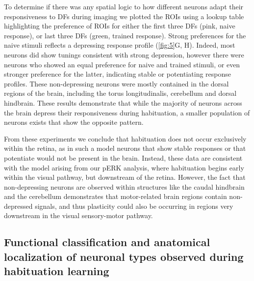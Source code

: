 \documentclass[9pt,lineno]{RandlettLab_elife}
\begin{document}
To determine if there was any spatial logic to how different neurons adapt their responsiveness to DFs during imaging we plotted the ROIs using a lookup table highlighting the preference of ROIs for either the first three DFs (pink, naive response), or last three DFs (green, trained response). Strong preferences for the naive stimuli reflects a depressing response profile (\autoref{fig:5}G, H). Indeed, most neurons did show tunings consistent with strong depression, however there were neurons who showed an equal preference for naive and trained stimuli, or even stronger preference for the latter, indicating stable or potentiating response profiles. These non-depressing neurons were mostly contained in the dorsal regions of the brain, including the torus longitudinalis, cerebellum and dorsal hindbrain. These results demonstrate that while the majority of neurons across the brain depress their responsiveness during habituation, a smaller population of neurons exists that show the opposite pattern. 

From these experiments we conclude that habituation does not occur exclusively within the retina, as in such a model neurons that show stable responses or that potentiate would not be present in the brain. Instead, these data are consistent with the model arising from our pERK analysis, where habituation begins early within the visual pathway, but downstream of the retina. However, the fact that non-depressing neurons are observed within structures like the caudal hindbrain and the cerebellum demonstrates that motor-related brain regions contain non-depressed signals, and thus plasticity could also be occurring in regions very downstream in the visual sensory-motor pathway.
\pagebreak
\subsection{Functional classification and anatomical localization of neuronal types observed during habituation learning}
\end{document}
